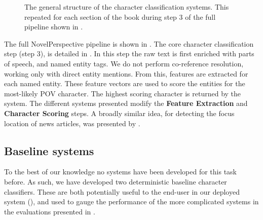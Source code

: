 \documentclass[]{book}
\begin{document}
\begin{figure*}
	\caption{The general structure of the character classification systems. This repeated for each section of the book during step 3 of the full pipeline shown in . \label{fig:classify}}
\end{figure*}

The full NovelPerspective pipeline is shown in .
The core character classification step (step 3), is detailed in .
In this step the raw text is first enriched with parts of speech, and named entity tags.
We do not perform co-reference resolution, working only with direct entity mentions.
From this, features are extracted for each named entity.
These feature vectors are used to score the entities for the most-likely POV character.
The highest scoring character is returned by the system.
The different systems presented modify the \textbf{Feature Extraction} and \textbf{Character Scoring} steps.
A broadly similar idea, for detecting the focus location of news articles, was presented by \textcite{2017focus}.


\subsection{Baseline systems}
To the best of our knowledge no systems have been developed for this task before.
As such, we have developed two deterministic baseline character classifiers.
These are both potentially useful to the end-user in our deployed system (),
and used to gauge the performance of the more complicated systems in the evaluations presented in .
\end{document}
